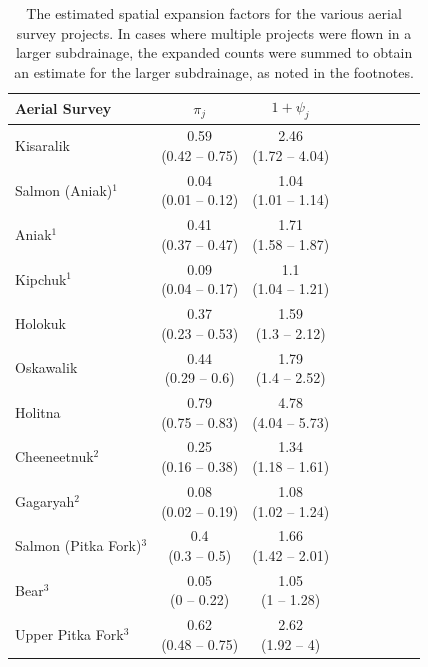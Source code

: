 \documentclass[12pt,]{book}
\theoremstyle{definition}
\theoremstyle{definition}
\theoremstyle{definition}
\theoremstyle{remark}
\begin{document}
\clearpage

\singlespacing

\begin{table}[H]

\caption{\label{tab:spat-expand-table}The estimated spatial expansion factors for the various aerial survey projects.
      In cases where multiple projects were flown in a larger subdrainage, the expanded counts
      were summed to obtain an estimate for the larger subdrainage, as noted in the footnotes.}
\centering
\begin{tabular}[t]{lcclcclcc}
\toprule
Aerial Survey & $\pi_j$ & $1 + \psi_j$\\
\midrule
Kisaralik & \makecell[c]{0.59\\(0.42 -- 0.75)} & \makecell[c]{2.46\\(1.72 -- 4.04)}\\
Salmon (Aniak)$^1$ & \makecell[c]{0.04\\(0.01 -- 0.12)} & \makecell[c]{1.04\\(1.01 -- 1.14)}\\
Aniak$^1$ & \makecell[c]{0.41\\(0.37 -- 0.47)} & \makecell[c]{1.71\\(1.58 -- 1.87)}\\
Kipchuk$^1$ & \makecell[c]{0.09\\(0.04 -- 0.17)} & \makecell[c]{1.1\\(1.04 -- 1.21)}\\
Holokuk & \makecell[c]{0.37\\(0.23 -- 0.53)} & \makecell[c]{1.59\\(1.3 -- 2.12)}\\
\addlinespace
Oskawalik & \makecell[c]{0.44\\(0.29 -- 0.6)} & \makecell[c]{1.79\\(1.4 -- 2.52)}\\
Holitna & \makecell[c]{0.79\\(0.75 -- 0.83)} & \makecell[c]{4.78\\(4.04 -- 5.73)}\\
Cheeneetnuk$^2$ & \makecell[c]{0.25\\(0.16 -- 0.38)} & \makecell[c]{1.34\\(1.18 -- 1.61)}\\
Gagaryah$^2$ & \makecell[c]{0.08\\(0.02 -- 0.19)} & \makecell[c]{1.08\\(1.02 -- 1.24)}\\
Salmon (Pitka Fork)$^3$ & \makecell[c]{0.4\\(0.3 -- 0.5)} & \makecell[c]{1.66\\(1.42 -- 2.01)}\\
\addlinespace
Bear$^3$ & \makecell[c]{0.05\\(0 -- 0.22)} & \makecell[c]{1.05\\(1 -- 1.28)}\\
Upper Pitka Fork$^3$ & \makecell[c]{0.62\\(0.48 -- 0.75)} & \makecell[c]{2.62\\(1.92 -- 4)}\\
\bottomrule
\end{tabular}
\end{table}
\end{document}
